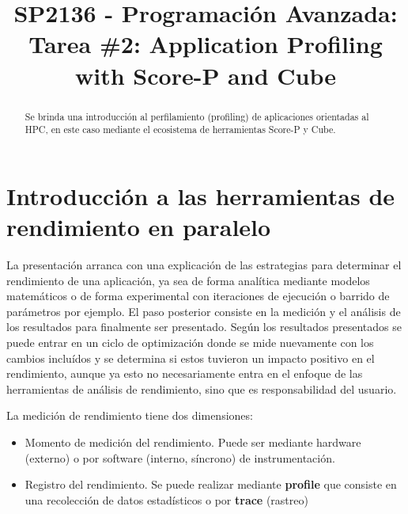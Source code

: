\documentclass[conference]{IEEEtran}
\begin{document}
%
\title{\LARGE SP2136 - Programación Avanzada:\\
    Tarea \#2: Application Profiling with Score-P and Cube}
%
\author{
}
\maketitle
%
\begin{abstract}
    Se brinda una introducción al perfilamiento (profiling) de aplicaciones orientadas al HPC, en este caso mediante el ecosistema de herramientas Score-P y Cube.
\end{abstract}

\IEEEpeerreviewmaketitle

\section{Introducción a las herramientas de rendimiento en paralelo}
La presentación \cite{profiling_scorep} arranca con una explicación de las estrategias para determinar el rendimiento de una aplicación, ya sea de forma analítica mediante modelos matemáticos o de forma experimental con iteraciones de ejecución o barrido de parámetros por ejemplo. El paso posterior consiste en la medición y el análisis de los resultados para finalmente ser presentado. Según los resultados presentados se puede entrar en un ciclo de optimización donde se mide nuevamente con los cambios incluídos y se determina si estos tuvieron un impacto positivo en el rendimiento, aunque ya esto no necesariamente entra en el enfoque de las herramientas de análisis de rendimiento, sino que es responsabilidad del usuario.

La medición de rendimiento tiene dos dimensiones:
\begin{itemize}
    \item Momento de medición del rendimiento. Puede ser mediante hardware (externo) o por software (interno, síncrono) de instrumentación.
    \item Registro del rendimiento. Se puede realizar mediante \textbf{profile} que consiste en una recolección de datos estadísticos o por \textbf{trace} (rastreo)
\end{itemize}
\end{document}
